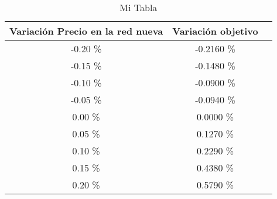 \begin{table}
\centering
\begin{tabular}{|c|c|c|}
\hline
 Variación Precio en la red nueva & Variación objetivo \\ \hline
-0.20 \% & -0.2160 \% \\ \hline
-0.15 \% & -0.1480 \% \\ \hline
-0.10 \% & -0.0900 \% \\ \hline
-0.05 \% & -0.0940 \% \\ \hline
0.00 \% & 0.0000 \% \\ \hline
0.05 \% & 0.1270 \% \\ \hline
0.10 \% & 0.2290 \% \\ \hline
0.15 \% & 0.4380 \% \\ \hline
0.20 \% & 0.5790 \% \\ \hline
\end{tabular}
\caption{Mi Tabla}
\end{table}
